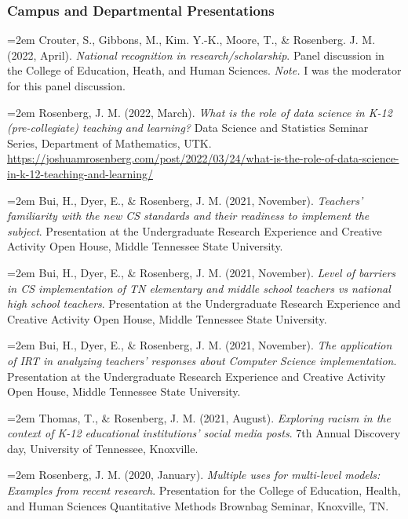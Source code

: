 \documentclass[
  14,
]{article}
\begin{document}
\hypertarget{campus-and-departmental-presentations}{%
\subsubsection{Campus and Departmental
Presentations}\label{campus-and-departmental-presentations}}

\hangindent=2em Crouter, S., Gibbons, M., Kim. Y.-K., Moore, T., \&
Rosenberg. J. M. (2022, April). \emph{National recognition in
research/scholarship}. Panel discussion in the College of Education,
Heath, and Human Sciences. \emph{Note.} I was the moderator for this
panel discussion.

\hangindent=2em Rosenberg, J. M. (2022, March). \emph{What is the role
of data science in K-12 (pre-collegiate) teaching and learning?} Data
Science and Statistics Seminar Series, Department of Mathematics, UTK.
\url{https://joshuamrosenberg.com/post/2022/03/24/what-is-the-role-of-data-science-in-k-12-teaching-and-learning/}

\hangindent=2em Bui, H., Dyer, E., \& Rosenberg, J. M. (2021, November).
\emph{Teachers' familiarity with the new CS standards and their
readiness to implement the subject}. Presentation at the Undergraduate
Research Experience and Creative Activity Open House, Middle Tennessee
State University.

\hangindent=2em Bui, H., Dyer, E., \& Rosenberg, J. M. (2021, November).
\emph{Level of barriers in CS implementation of TN elementary and middle
school teachers vs national high school teachers}. Presentation at the
Undergraduate Research Experience and Creative Activity Open House,
Middle Tennessee State University.

\hangindent=2em Bui, H., Dyer, E., \& Rosenberg, J. M. (2021, November).
\emph{The application of IRT in analyzing teachers' responses about
Computer Science implementation}. Presentation at the Undergraduate
Research Experience and Creative Activity Open House, Middle Tennessee
State University.

\hangindent=2em Thomas, T., \& Rosenberg, J. M. (2021, August).
\emph{Exploring racism in the context of K-12 educational institutions'
social media posts}. 7th Annual Discovery day, University of Tennessee,
Knoxville.

\hangindent=2em Rosenberg, J. M. (2020, January). \emph{Multiple uses
for multi-level models: Examples from recent research}. Presentation for
the College of Education, Health, and Human Sciences Quantitative
Methods Brownbag Seminar, Knoxville, TN.
\end{document}
